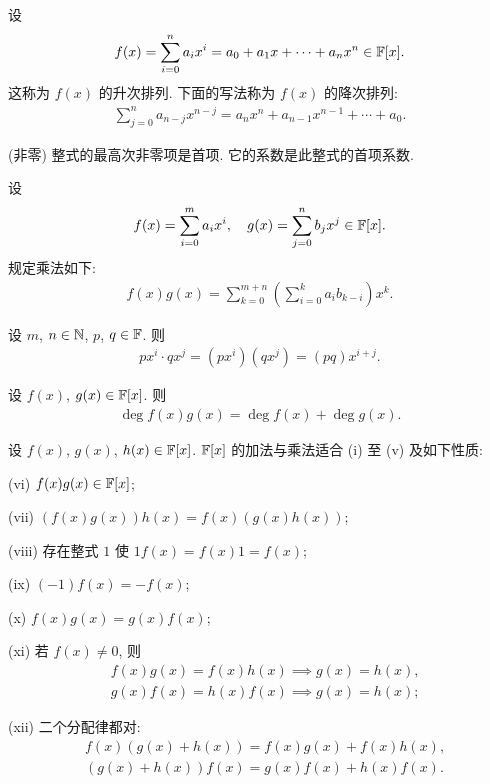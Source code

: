 \begin{definition}
    设
    \begin{align*}
        f(x) = \sum_{i=0}^n a_i x^i = a_0 + a_1 x + \cdots + a_n x^n \in \mathbb{F}[x].
    \end{align*}
    这称为 $f(x)$ 的升次排列. 下面的写法称为 $f(x)$ 的降次排列:
    \begin{align*}
        \sum_{j=0}^{n} a_{n-j} x^{n-j} = a_n x^n + a_{n-1} x^{n-1} + \cdots + a_0.
    \end{align*}

    (非零) 整式的最高次非零项是首项. 它的系数是此整式的首项系数.
\end{definition}

\begin{definition}
    设
    \begin{align*}
        f(x) = \sum_{i=0}^m a_i x^i, \quad g(x) = \sum_{j=0}^n b_j x^j \in \mathbb{F}[x].
    \end{align*}
    规定乘法如下:
    \begin{align*}
        f(x) g(x) = \sum_{k=0}^{m+n} \left( \sum_{i=0}^k a_i b_{k-i} \right) x^k.
    \end{align*}
\end{definition}

\begin{proposition}
    设 $m$, $n \in \mathbb{N}$, $p$, $q \in \mathbb{F}$. 则
    \begin{align*}
        px^i \cdot qx^j = (px^i) (qx^j) = (pq)x^{i + j}.
    \end{align*}
\end{proposition}

\begin{proposition}
    设 $f(x)$, $g(x) \in \mathbb{F}[x]$. 则
    \begin{align*}
        \deg f(x) g(x) = \deg f(x) + \deg g(x).
    \end{align*}
\end{proposition}

\begin{proposition}
    设 $f(x)$, $g(x)$, $h(x) \in \mathbb{F}[x]$. $\mathbb{F}[x]$ 的加法与乘法适合 (i) 至 (v) 及如下性质:

    (vi) $f(x) g(x) \in \mathbb{F}[x]$;

    (vii) $(f(x) g(x)) h(x) = f(x) (g(x) h(x))$;

    (viii) 存在整式 $1$ 使 $1f(x) = f(x)1 = f(x)$;

    (ix) $(-1)f(x) = -f(x)$;

    (x) $f(x) g(x) = g(x) f(x)$;

    (xi) 若 $f(x) \neq 0$, 则
    \begin{align*}
         & f(x) g(x) = f(x) h(x) \implies g(x) = h(x), \\
         & g(x) f(x) = h(x) f(x) \implies g(x) = h(x);
    \end{align*}

    (xii) 二个分配律都对:
    \begin{align*}
         & f(x) (g(x) + h(x)) = f(x) g(x) + f(x) h(x), \\
         & (g(x) + h(x)) f(x) = g(x) f(x) + h(x) f(x).
    \end{align*}
\end{proposition}

